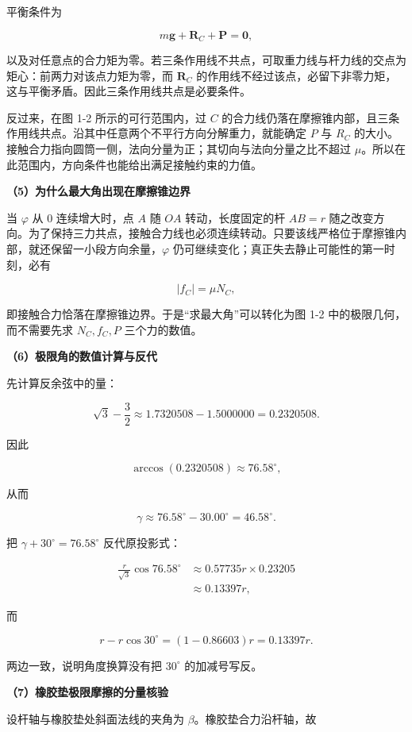 \documentclass[12pt,a4paper,UTF8]{ctexart}
\begin{document}
平衡条件为

\[
m\bm g+\bm R_C+\bm P=\bm0,
\tag{1}
\]

以及对任意点的合力矩为零。若三条作用线不共点，可取重力线与杆力线的交点为矩心：前两力对该点力矩为零，而
\(\bm R_C\)
的作用线不经过该点，必留下非零力矩，这与平衡矛盾。因此三条作用线共点是必要条件。

反过来，在图 1-2 所示的可行范围内，过 \(C\)
的合力线仍落在摩擦锥内部，且三条作用线共点。沿其中任意两个不平行方向分解重力，就能确定
\(P\) 与 \(R_C\)
的大小。接触合力指向圆筒一侧，法向分量为正；其切向与法向分量之比不超过
\(\mu\)。所以在此范围内，方向条件也能给出满足接触约束的力值。

\textbf{（5）为什么最大角出现在摩擦锥边界}

当 \(\varphi\) 从 \(0\) 连续增大时，点 \(A\) 随 \(OA\)
转动，长度固定的杆 \(AB=r\)
随之改变方向。为了保持三力共点，接触合力线也必须连续转动。只要该线严格位于摩擦锥内部，就还保留一小段方向余量，\(\varphi\)
仍可继续变化；真正失去静止可能性的第一时刻，必有

\[
|f_C|=\mu N_C,
\tag{2}
\]

即接触合力恰落在摩擦锥边界。于是``求最大角''可以转化为图 1-2
中的极限几何，而不需要先求 \(N_C,f_C,P\) 三个力的数值。

\textbf{（6）极限角的数值计算与反代}

先计算反余弦中的量：

\[
\sqrt3-\frac32
\approx1.7320508-1.5000000
=0.2320508.
\]

因此

\[
\arccos(0.2320508)\approx76.58^\circ,
\]

从而

\[
\gamma\approx76.58^\circ-30.00^\circ
=46.58^\circ.
\]

把 \(\gamma+30^\circ=76.58^\circ\) 反代原投影式：

\[
\begin{aligned}
\frac r{\sqrt3}\cos76.58^\circ
&\approx0.57735r\times0.23205\\
&\approx0.13397r,
\end{aligned}
\]

而

\[
r-r\cos30^\circ
=(1-0.86603)r
=0.13397r.
\]

两边一致，说明角度换算没有把 \(30^\circ\) 的加减号写反。

\textbf{（7）橡胶垫极限摩擦的分量核验}

设杆轴与橡胶垫处斜面法线的夹角为 \(\beta\)。橡胶垫合力沿杆轴，故
\end{document}
